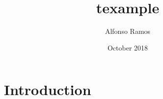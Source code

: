 \documentclass{article}
\title{texample}
\author{Alfonso Ramos}
\date{October 2018}
\begin{document}
\maketitle

\section{Introduction}
\end{document}
